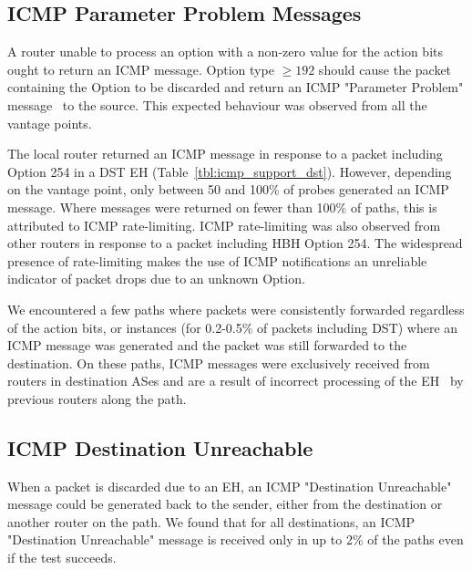 \documentclass[conference]{IEEEtran}
\begin{document}
\subsection{ICMP Parameter Problem Messages}


A router unable to process an option with a non-zero value
for the action bits ought to return an ICMP message.
Option type $\ge 192$ should cause the packet containing the Option to be discarded and
return an ICMP "Parameter Problem" message~\cite{rfc8200} to the source.
This expected behaviour was observed from all the vantage points. 

The local router returned an ICMP message in response to a packet including Option 254 in a DST EH
(Table~\ref{tbl:icmp_support_dst}).  However, depending on the vantage point, only between 50 and 100\% of
probes generated an ICMP message.
Where messages were returned on fewer than 100\% of paths, this is attributed to ICMP
rate-limiting.  ICMP rate-limiting was
also observed from other routers in response to a packet including HBH Option 254. The widespread presence of
rate-limiting makes the use of ICMP notifications an unreliable
indicator of packet drops due to an unknown Option.

We encountered a few paths where packets were consistently
forwarded regardless of the action bits, or instances (for 0.2-0.5\% of packets including DST) where an ICMP message
was generated and the packet was still forwarded to the destination. 
On these paths, ICMP messages were exclusively received from
routers in destination ASes and are a result of incorrect processing of the EH~\cite{rfc8200} by previous routers along the path.


\subsection{ICMP Destination Unreachable}

When a packet is discarded due to an EH, an ICMP "Destination Unreachable"
message could be generated back to the sender, either from the destination or another router on the path.
We found that for all destinations, an ICMP
"Destination Unreachable" message is received only in up to 2\% of the paths
even if the test succeeds.  
\end{document}
